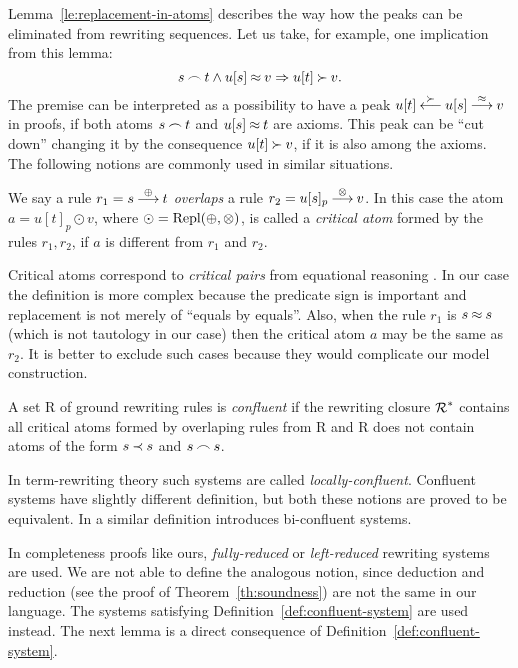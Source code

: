Lemma~\ref{le:replacement-in-atoms} describes the way how the peaks can be eliminated
from rewriting sequences. Let us take, for example, one implication from this lemma:
\[s\mathbin{\frown} t\land u[s]\mathbin{\approx} v\mathrel\Rightarrow u[t]\mathbin{\succ} v.\]
The premise can be interpreted as a possibility to have a peak \(u[t] \mathbin{\stackrel{\mathbin{\succ}}{\longleftarrow}}
u[s] \mathbin{\stackrel{\mathbin{\approx}}{\longrightarrow}} v \) in proofs, if both atoms \(s\mathbin{\frown} t\) and \(u[s]\mathbin{\approx} t\) are
axioms. This peak can be ``cut down'' changing it by the consequence
\(u[t]\mathbin{\succ} v\), if it is also among the axioms. The following notions are
commonly used in similar situations. 

\begin{DEFINITION} \label {def:critical-atom}
We say a rule \(r_1 = s\mathbin{\stackrel{\oplus}{\longrightarrow}} t\) {\em overlaps} a rule \(r_2 = u[s]_p
 \mathbin{\stackrel{\otimes}{\longrightarrow}} v\). In this case the atom \(a = u[t]_p \odot v\), where
 \(\odot = \mbox{\rm Repl}(\oplus,\otimes)\), 
is called a {\em critical atom} formed by the rules \(r_1,r_2\), if $a$ is
different from \(r_1\) and \(r_2\).
\end{DEFINITION}

Critical atoms correspond to {\em critical pairs} from equational reasoning
\cite{Der}. In our case the definition is more complex because the predicate
sign is important and replacement is not merely of ``equals by equals''. 
Also, when the
rule \(r_1\) is  \(s\mathbin{\approx} s\) (which is not tautology in our case) then the
critical atom $a$ may be the same as \(r_2\). It is better to exclude such
cases because they would complicate our model construction. 

\begin{DEFINITION} \label{def:confluent-system}
A set \C R of ground rewriting rules is {\em confluent} if the rewriting
closure $\mbox{$\cal R$}^\ast$ contains all critical atoms formed by overlaping rules
from \C R and \C R does not contain atoms of the form $s\mathbin{\prec} s$ and $s\mathbin{\frown}
s$.
\end{DEFINITION}

In term-rewriting theory \cite{Der} such systems are called {\em
locally-confluent}. Confluent systems have slightly different definition, but
both these notions are proved to be equivalent.  In \cite{LA} a similar
definition introduces bi-confluent systems.

In completeness proofs like ours, {\em fully-reduced} \cite{PP} or {\em
left-reduced} \cite{S-A,BG} rewriting systems are used.  We are not able to
define the analogous notion, since deduction and reduction (see the proof of
Theorem~\ref{th:soundness}) are not the same in our language. The systems
satisfying Definition~\ref{def:confluent-system} are used instead. The next
lemma is a direct consequence of Definition~\ref{def:confluent-system}.

